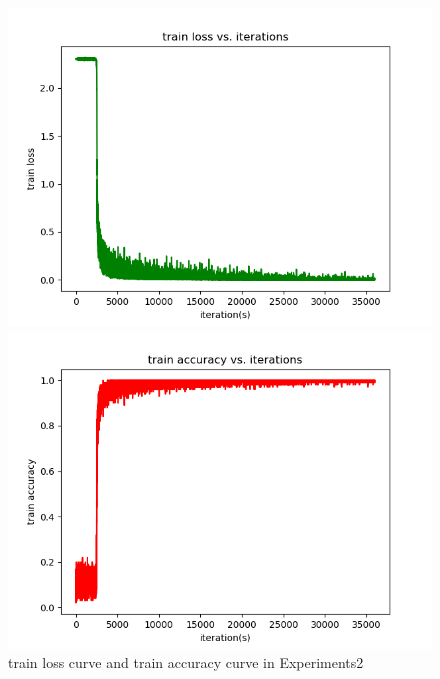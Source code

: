 \documentclass{elegantbook}
\begin{document}
\begin{figure}[!h]
	\centering
	\begin{minipage}[t]{0.48\textwidth}
		\centering
		\includegraphics[width=\textwidth]{../results/trainloss2}
	\end{minipage}
	\begin{minipage}[t]{0.48\textwidth}
		\centering
		\includegraphics[width=\textwidth]{../results/trainacc2}
	\end{minipage}
	\caption{\label{trainres2}train loss curve and train accuracy curve in Experiments2}
\end{figure}
\end{document}
